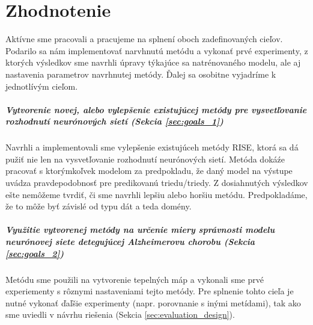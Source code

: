 \chapter{Zhodnotenie}

Aktívne sme pracovali a pracujeme na splnení oboch zadefinovaných cieľov. Podarilo sa nám implementovať narvhnutú metódu a vykonať prvé experimenty, z ktorých výsledkov sme navrhli úpravy týkajúce sa natrénovaného modelu, ale aj nastavenia parametrov navrhnutej metódy. Ďalej sa osobitne vyjadríme k jednotlívým cieľom.

\paragraph{Vytvorenie novej, alebo vylepšenie existujúcej metódy pre vysvetľovanie rozhodnutí neurónových sietí (Sekcia \ref{sec:goals_1})}

Navrhli a implementovali sme vylepšenie existujúceh metódy RISE, ktorá sa dá pužiť nie len na vysvetľovanie rozhodnutí neurónových sietí. Metóda dokáźe pracovať s ktorýmkoľvek modelom za predpokladu, že daný model na výstupe uvádza pravdepodobnosť pre predikovanú triedu/triedy. Z dosiahnutých výsledkov ešte nemôžeme tvrdiť, či sme navrhli lepšiu alebo horšiu metódu. Predpokladáme, že to môže byť závislé od typu dát a teda domény.

\paragraph{Využitie vytvorenej metódy na určenie miery správnosti modelu neurónovej siete detegujúcej Alzheimerovu chorobu (Sekcia \ref{sec:goals_2})}

Metódu sme použili na vytvorenie tepelných máp a vykonali sme prvé experiementy s rôznymi nastaveniami tejto metódy. Pre splnenie tohto cieľa je nutné vykonať ďaľšie experimenty (napr. porovnanie s inými metídami), tak ako sme uviedli v návrhu riešenia (Sekcia \ref{sec:evaluation_design}).



